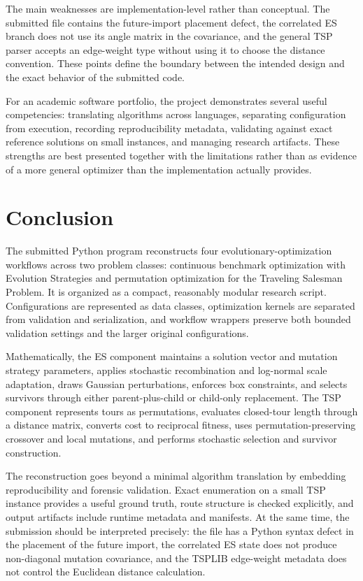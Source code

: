 \documentclass[11pt,a4paper]{article}
\begin{document}
The main weaknesses are implementation-level rather than conceptual. The submitted file contains the future-import placement defect, the correlated ES branch does not use its angle matrix in the covariance, and the general TSP parser accepts an edge-weight type without using it to choose the distance convention. These points define the boundary between the intended design and the exact behavior of the submitted code.

For an academic software portfolio, the project demonstrates several useful competencies: translating algorithms across languages, separating configuration from execution, recording reproducibility metadata, validating against exact reference solutions on small instances, and managing research artifacts. These strengths are best presented together with the limitations rather than as evidence of a more general optimizer than the implementation actually provides.

\section{Conclusion}
The submitted Python program reconstructs four evolutionary-optimization workflows across two problem classes: continuous benchmark optimization with Evolution Strategies and permutation optimization for the Traveling Salesman Problem. It is organized as a compact, reasonably modular research script. Configurations are represented as data classes, optimization kernels are separated from validation and serialization, and workflow wrappers preserve both bounded validation settings and the larger original configurations.

Mathematically, the ES component maintains a solution vector and mutation strategy parameters, applies stochastic recombination and log-normal scale adaptation, draws Gaussian perturbations, enforces box constraints, and selects survivors through either parent-plus-child or child-only replacement. The TSP component represents tours as permutations, evaluates closed-tour length through a distance matrix, converts cost to reciprocal fitness, uses permutation-preserving crossover and local mutations, and performs stochastic selection and survivor construction.

The reconstruction goes beyond a minimal algorithm translation by embedding reproducibility and forensic validation. Exact enumeration on a small TSP instance provides a useful ground truth, route structure is checked explicitly, and output artifacts include runtime metadata and manifests. At the same time, the submission should be interpreted precisely: the file has a Python syntax defect in the placement of the future import, the correlated ES state does not produce non-diagonal mutation covariance, and the TSPLIB edge-weight metadata does not control the Euclidean distance calculation.
\end{document}

